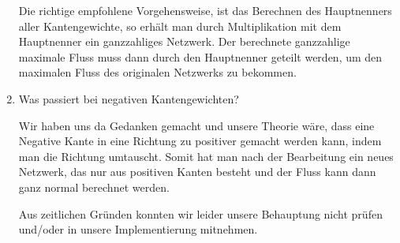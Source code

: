 \documentclass[a4paper]{article}
\begin{document}
\begin{enumerate}
\begin{answer}
			Die richtige empfohlene Vorgehensweise, ist das Berechnen des Hauptnenners aller Kantengewichte, so erhält man durch Multiplikation mit dem Hauptnenner ein ganzzahliges Netzwerk.
			Der berechnete ganzzahlige maximale Fluss muss dann durch den Hauptnenner geteilt werden, um den maximalen Fluss des originalen Netzwerks zu bekommen.
		\end{answer}
	\item Was passiert bei negativen Kantengewichten?
		\begin{answer}
			Wir haben uns da Gedanken gemacht und unsere Theorie wäre, dass eine Negative Kante in eine Richtung zu positiver gemacht werden kann, indem man die Richtung umtauscht.
			Somit hat man nach der Bearbeitung ein neues Netzwerk, das nur aus positiven Kanten besteht und der Fluss kann dann ganz normal berechnet werden.

			Aus zeitlichen Gründen konnten wir leider unsere Behauptung nicht prüfen und/oder in unsere Implementierung mitnehmen.
		\end{answer}
\end{enumerate}



%
\end{document}
